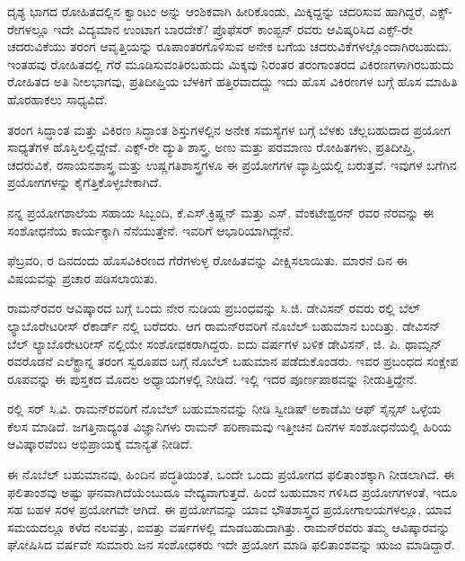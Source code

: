 
ದೃಶ್ಯ ಭಾಗದ ರೋಹಿತದಲ್ಲಿನ ಕ್ವಾಂಟಂ ಅನ್ನು ಆಂಶಿಕವಾಗಿ ಹೀರಿಕೊಂಡು, ಮಿಕ್ಕಿದ್ದನ್ನು ಚದರಿಸುವ ಹಾಗಿದ್ದರೆ, ಎಕ್ಸ್-ರೇಗಳಲ್ಲೂ ಇದೇ ವಿದ್ಯಮಾನ ಉಂಟಾಗ ಬಾರದೇಕೆ? ಪ್ರೊಫೆಸರ್ ಕಾಂಪ್ಟನ್ ರವರು ಆವಿಷ್ಕರಿಸಿದ ಎಕ್ಸ್-ರೇ ಚದರುವಿಕೆಯು ತರಂಗ ಆವೃತ್ತಿಯನ್ನು ರೂಪಾಂತರಗೊಳಿಸುವ ಅನೇಕ ಬಗೆಯ ಚದರುವಿಕೆಗಳಲ್ಲೊಂದಾಗಿರಬಹುದು. ಇಂತಹವು ರೋಹಿತದಲ್ಲಿ ಗೆರೆ ಮೂಡಿಸುವಂತಿರಬಹುದು ಮಿಕ್ಕವು ನಿರಂತರ ತರಂಗಾಂತರದ ವಿಕಿರಣಗಳಾಗಿರಬಹುದು ರೋಹಿತದ ಅತಿ ನೀಲಭಾಗವು, ಪ್ರತಿದೀಪ್ತಿಯ ಬೆಳಕಿಗೆ ಹತ್ತಿರವಾದದ್ದು ಇದು ಹೊಸ ವಿಕಿರಣಗಳ ಬಗ್ಗೆ ಹೊಸ ಮಾಹಿತಿ ಹೊರಹಾಕಲು ಸಾಧ್ಯವಿದೆ.



ತರಂಗ ಸಿದ್ಧಾಂತ ಮತ್ತು ವಿಕಿರಣ ಸಿದ್ಧಾಂತ ಶಿಸ್ತುಗಳಲ್ಲಿನ ಅನೇಕ ಸಮಸ್ಯೆಗಳ ಬಗ್ಗೆ ಬೆಳಕು ಚೆಲ್ಲಬಹುದಾದ ಪ್ರಯೋಗ ಸಾಧ್ಯತೆಗಳ ಹೊಸ್ತಿಲಲ್ಲಿದ್ದೇವೆ. ಎಕ್ಸ್-ರೇ ದ್ಯುತಿ ಶಾಸ್ತ್ರ, ಅಣು ಮತ್ತು ಪರಮಾಣು ರೋಹಿತಗಳು, ಪ್ರತಿದೀಪ್ತಿ, ಚದರುವಿಕೆ, ರಸಾಯನಶಾಸ್ತ್ರ ಮತ್ತು ಉಷ್ಣಗತಿಶಾಸ್ತ್ರಗಳೂ ಈ ಪ್ರಯೋಗಗಳ ವ್ಯಾಪ್ತಿಯಲ್ಲಿ ಬರುತ್ತವೆ. ಇವುಗಳ ಬಗೆಗಿನ ಪ್ರಯೋಗಗಳನ್ನು ಕೈಗೆತ್ತಿಕೊಳ್ಳಬೇಕಾಗಿದೆ.

ನನ್ನ ಪ್ರಯೋಗಶಾಲೆಯ ಸಹಾಯ ಸಿಬ್ಬಂದಿ, ಕೆ.ಎಸ್.ಕ್ರಿಷ್ಣನ್ ಮತ್ತು ಎಸ್. ವೆಂಕಟೇಶ್ವರನ್ ರವರ ನೆರವನ್ನು ಈ ಸಂಶೋಧನೆಯ ಕಾರ್ಯಕ್ಕಾಗಿ ನೆನೆಯುತ್ತೇನೆ. ಇವರಿಗೆ ಆಭಾರಿಯಾಗಿದ್ದೇನೆ.

 ಫೆಬ್ರವರಿ,  ರ ದಿನದಂದು ಹೊಸವಿಕಿರಣದ ಗೆರೆಗಳುಳ್ಳ ರೋಹಿತವನ್ನು ವೀಕ್ಷಿಸಲಾಯಿತು. ಮಾರನೆ ದಿನ ಈ ವಿಷಯವನ್ನು ಪ್ರಚಾರ ಪಡಿಸಲಾಯಿತು.



ರಾಮನ್‍ರವರ ಆವಿಷ್ಕಾರದ ಬಗ್ಗೆ ಒಂದು ನೇರ ನುಡಿಯ ಪ್ರಬಂಧವನ್ನು ಸಿ.ಜಿ. ಡೇವಿಸನ್ ರವರು ರಲ್ಲಿ ಬೆಲ್ ಲ್ಯಾಬೊರೇಟರೀಸ್ ರೆಕಾರ್ಡ್ ನಲ್ಲಿ ಬರೆದರು. ಆಗ ರಾಮನ್‍ರವರಿಗೆ ನೊಬೆಲ್ ಬಹುಮಾನ ಬಂದಿತ್ತು. ಡೇವಿಸನ್ ಬೆಲ್ ಲ್ಯಾಬೊರೇಟರೀಸ್ ನಲ್ಲಿಯೇ ಸಂಶೋಧಕರಾಗಿದ್ದರು. ಐದು ವರ್ಷಗಳ ಬಳಿಕ ಡೇವಿಸನ್, ಜಿ. ಪಿ. ಥಾಮ್ಸನ್ ರವರೊಡನೆ ಎಲೆಕ್ಟ್ರಾನ್ನ ತರಂಗ ಸ್ವರೂಪದ ಬಗ್ಗೆ ನೊಬೆಲ್ ಬಹುಮಾನ ಪಡೆದುಕೊಂಡರು. ಇವರ ಪ್ರಬಂಧದ ಸಂಕ್ಷೇಪ ರೂಪವನ್ನು ಈ ಪುಸ್ತಕದ ಮೊದಲ ಅಧ್ಯಾಯಗಳಲ್ಲಿ ನೀಡಿದೆ. ಇಲ್ಲಿ ಇದರ ಪೂರ್ಣಪಾಠವನ್ನು ನೀಡುತ್ತಿದ್ದೇನೆ.

ರಲ್ಲಿ ಸರ್ ಸಿ.ವಿ. ರಾಮನ್‍ರವರಿಗೆ ನೊಬೆಲ್ ಬಹುಮಾನವನ್ನು ನೀಡಿ ಸ್ವೀಡಿಷ್ ಅಕಾಡೆಮಿ ಆಫ್ ಸೈನ್ಸಸ್ ಒಳ್ಳೆಯ ಕೆಲಸ ಮಾಡಿದೆ. ಜಗತ್ತಿನಾದ್ಯಂತ ವಿಜ್ಞಾನಿಗಳು ರಾಮನ್ ಪರಿಣಾಮವು ಇತ್ತೀಚಿನ ದಿನಗಳ ಸಂಶೋಧನೆಯಲ್ಲಿ ಹಿರಿಯ ಆವಿಷ್ಕಾರವೆಂಬ ಅಭಿಪ್ರಾಯಕ್ಕೆ ಮಾನ್ಯತೆ ನೀಡಿದೆ.

ಈ ನೊಬೆಲ್ ಬಹುಮಾನವು, ಹಿಂದಿನ ಪದ್ಧತಿಯಂತೆ, ಒಂದೇ ಒಂದು ಪ್ರಯೋಗದ ಫಲಿತಾಂಶಕ್ಕಾಗಿ ನೀಡಲಾಗಿದೆ. ಈ ಫಲಿತಾಂಶವು ಅಷ್ಟು ಘನವಾಗಿದೆಯೆಂಬುದೂ ವೇದ್ಯವಾಗುತ್ತದೆ. ಹಿಂದೆ ಬಹುಮಾನ ಗಳಿಸಿದ ಪ್ರಯೋಗಗಳಂತೆ, ಇದೂ ಸಹ ಬಹಳ ಸರಳ ಪ್ರಯೋಗವೇ ಆಗಿದೆ. ಈ ಪ್ರಯೋಗವನ್ನು ಯಾವ ಭೌತಶಾಸ್ತ್ರದ ಪ್ರಯೋಗಾಲಯಗಳಲ್ಲೂ, ಯಾವ ಸಮಯದಲ್ಲೂ ಕಳೆದ ನಲವತ್ತು, ಐವತ್ತು ವರ್ಷಗಳಲ್ಲಿ ಮಾಡಬಹುದಾಗಿತ್ತು. ರಾಮನ್‍ರವರು ತಮ್ಮ ಆವಿಷ್ಕಾರವನ್ನು ಘೋಷಿಸಿದ ವರ್ಷವೇ ಸುಮಾರು  ಜನ ಸಂಶೋಧಕರು ಇದೇ ಪ್ರಯೋಗ ಮಾಡಿ ಫಲಿತಾಂಶವನ್ನು ಋಜು ಮಾಡಿದ್ದಾರೆ.

